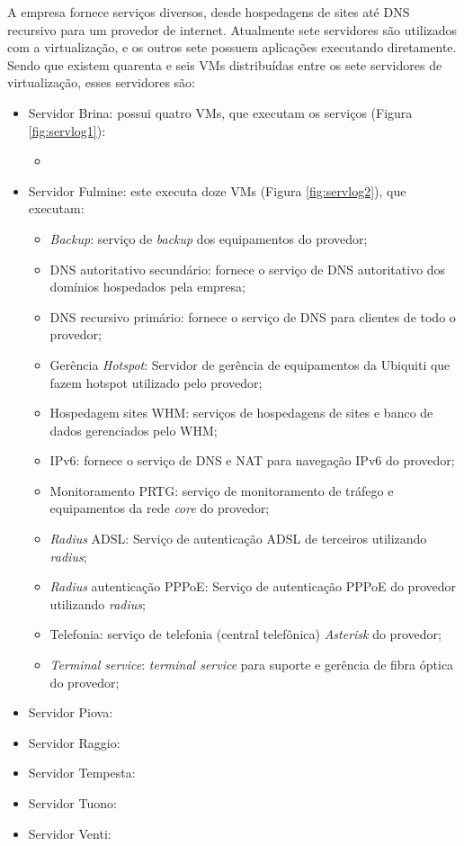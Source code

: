 A empresa fornece serviços diversos, desde hospedagens de sites até \ac{DNS} recursivo para um provedor de internet. 
Atualmente sete servidores são utilizados com a virtualização, e os outros sete possuem aplicações executando diretamente. 
Sendo que existem quarenta e seis \ac{VM}s distribuídas entre os sete servidores de virtualização, esses servidores são:
\begin{itemize}
 \item Servidor Brina: possui quatro \ac{VM}s, que executam os serviços (Figura \ref{fig:servlog1}):
 \begin{itemize}
  \item 
 \end{itemize}
 \item Servidor Fulmine: este executa doze \ac{VM}s (Figura \ref{fig:servlog2}), que executam:
 \begin{itemize}
  \item \textit{Backup}: serviço de \textit{backup} dos equipamentos do provedor;
  \item \ac{DNS} autoritativo secundário: fornece o serviço de \ac{DNS} autoritativo dos domínios hospedados pela empresa;
  \item \ac{DNS} recursivo primário: fornece o serviço de \ac{DNS} para clientes de todo o provedor;
  \item Gerência \textit{Hotspot}: Servidor de gerência de equipamentos da Ubiquiti que fazem hotspot utilizado pelo provedor;
  \item Hospedagem sites \ac{WHM}: serviços de hospedagens de sites e banco de dados gerenciados pelo \ac{WHM};
  \item \ac{IPv6}: fornece o serviço de \ac{DNS} e \ac{NAT} para navegação \ac{IPv6} do provedor;
  \item Monitoramento \ac{PRTG}: serviço de monitoramento de tráfego e equipamentos da rede \textit{core} do provedor;
  \item \textit{Radius} \ac{ADSL}: Serviço de autenticação \ac{ADSL} de terceiros utilizando \textit{radius};
  \item \textit{Radius} autenticação \ac{PPPoE}: Serviço de autenticação \ac{PPPoE} do provedor utilizando \textit{radius};
  \item Telefonia: serviço de telefonia (central telefônica) \textit{Asterisk} do provedor;
  \item \textit{Terminal service}: \textit{terminal service} para suporte e gerência de fibra óptica do provedor;
 \end{itemize}
 \item Servidor Piova: 

 \item Servidor Raggio: 
 
 \item Servidor Tempesta: 
 
 \item Servidor Tuono: 
 
 \item Servidor Venti: 

\end{itemize}

